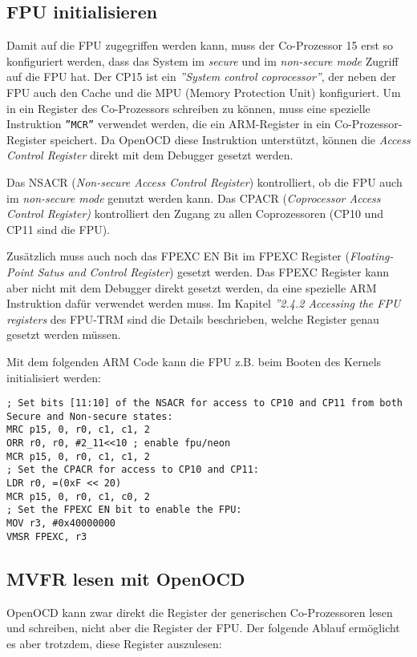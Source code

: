 \subsection{FPU initialisieren}
Damit auf die FPU zugegriffen werden kann, muss der Co-Prozessor 15 erst so konfiguriert werden, dass das System im \textit{secure} und im \textit{non-secure mode} Zugriff auf die FPU hat.
Der CP15 ist ein \textit{''System control coprocessor''}, der neben der FPU auch den Cache und die MPU (Memory Protection Unit) konfiguriert.
Um in ein Register des Co-Prozessors schreiben zu können, muss eine spezielle Instruktion \texttt{''MCR''} verwendet werden, die ein ARM-Register in ein Co-Prozessor-Register speichert.
Da OpenOCD diese Instruktion unterstützt, können die \textit{Access Control Register} direkt mit dem Debugger gesetzt werden.

Das NSACR (\textit{Non-secure Access Control Register}) kontrolliert, ob die FPU auch im \textit{non-secure mode} genutzt werden kann.
Das CPACR (\textit{Coprocessor Access Control Register)} kontrolliert den Zugang zu allen Coprozessoren (CP10 und CP11 sind die FPU).

Zusätzlich muss auch noch das FPEXC EN Bit im FPEXC Register (\textit{Floating-Point Satus and Control Register}) gesetzt werden.
Das FPEXC Register kann aber nicht mit dem Debugger direkt gesetzt werden, da eine spezielle ARM Instruktion dafür verwendet werden muss.
Im Kapitel \textit{''2.4.2 Accessing the FPU registers} des FPU-TRM\cite{bib:FPUTechnicalReferenceManual} sind die Details beschrieben, welche Register genau gesetzt werden müssen.

Mit dem folgenden ARM Code kann die FPU z.B. beim Booten des Kernels initialisiert werden:

\lstset{language=[x86masm]Assembler}
\begin{lstlisting}[frame=single]
; Set bits [11:10] of the NSACR for access to CP10 and CP11 from both Secure and Non-secure states:
MRC p15, 0, r0, c1, c1, 2
ORR r0, r0, #2_11<<10 ; enable fpu/neon
MCR p15, 0, r0, c1, c1, 2
; Set the CPACR for access to CP10 and CP11:
LDR r0, =(0xF << 20)
MCR p15, 0, r0, c1, c0, 2
; Set the FPEXC EN bit to enable the FPU:
MOV r3, #0x40000000
VMSR FPEXC, r3
\end{lstlisting}


\subsection{MVFR lesen mit OpenOCD}
OpenOCD kann zwar direkt die Register der generischen Co-Prozessoren lesen und schreiben, nicht aber die Register der FPU.
Der folgende Ablauf ermöglicht es aber trotzdem, diese Register auszulesen:

